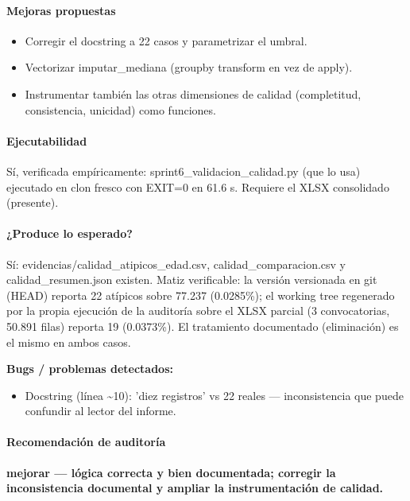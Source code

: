 \paragraph{Mejoras propuestas}
\begin{itemize}
  \item Corregir el docstring a 22 casos y parametrizar el umbral.
  \item Vectorizar imputar\_mediana (groupby transform en vez de apply).
  \item Instrumentar también las otras dimensiones de calidad (completitud, consistencia, unicidad) como funciones.
\end{itemize}

\paragraph{Ejecutabilidad}
Sí, verificada empíricamente: sprint6\_validacion\_calidad.py (que lo usa) ejecutado en clon fresco con EXIT=0 en 61.6 s. Requiere el XLSX consolidado (presente).

\paragraph{¿Produce lo esperado?}
Sí: evidencias/calidad\_atipicos\_edad.csv, calidad\_comparacion.csv y calidad\_resumen.json existen. Matiz verificable: la versión versionada en git (HEAD) reporta 22 atípicos sobre 77.237 (0.0285\%); el working tree regenerado por la propia ejecución de la auditoría sobre el XLSX parcial (3 convocatorias, 50.891 filas) reporta 19 (0.0373\%). El tratamiento documentado (eliminación) es el mismo en ambos casos.

\begin{tcolorbox}[riesgo]
\textbf{Bugs / problemas detectados:}
\begin{itemize}
  \item Docstring (línea \textasciitilde{}10): 'diez registros' vs 22 reales --- inconsistencia que puede confundir al lector del informe.
\end{itemize}
\end{tcolorbox}

\paragraph{Recomendación de auditoría}
\textbf{mejorar --- lógica correcta y bien documentada; corregir la inconsistencia documental y ampliar la instrumentación de calidad.}

